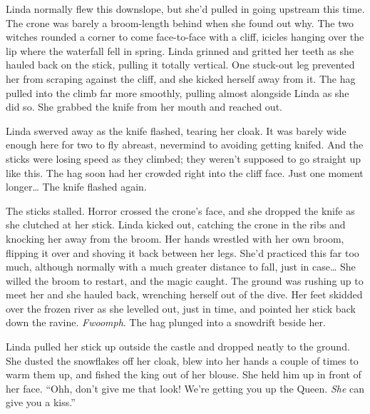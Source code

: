 Linda normally flew this downslope, but she'd pulled in going upstream this time.
The crone was barely a broom-length behind when she found out why.
The two witches rounded a corner to come face-to-face with a cliff, icicles hanging over the lip where the waterfall fell in spring.
Linda grinned and gritted her teeth as she hauled back on the stick, pulling it totally vertical.
One stuck-out leg prevented her from scraping against the cliff, and she kicked herself away from it.
The hag pulled into the climb far more smoothly, pulling almost alongside Linda as she did so.
She grabbed the knife from her mouth and reached out.

Linda swerved away as the knife flashed, tearing her cloak.
It was barely wide enough here for two to fly abreast, nevermind to avoiding getting knifed.
And the sticks were losing speed as they climbed; they weren't supposed to go straight up like this.
The hag soon had her crowded right into the cliff face.
Just one moment longer{\dots}
The knife flashed again.

The sticks stalled.
Horror crossed the crone's face, and she dropped the knife as she clutched at her stick.
Linda kicked out, catching the crone in the ribs and knocking her away from the broom.
Her hands wrestled with her own broom, flipping it over and shoving it back between her legs.
She'd practiced this far too much, although normally with a much greater distance to fall, just in case{\dots}
She willed the broom to restart, and the magic caught.
The ground was rushing up to meet her and she hauled back, wrenching herself out of the dive.
Her feet skidded over the frozen river as she levelled out, just in time, and pointed her stick back down the ravine.
\emph{Fwoomph}.
The hag plunged into a snowdrift beside her.

\storybreak

Linda pulled her stick up outside the castle and dropped neatly to the ground.
She dusted the snowflakes off her cloak, blew into her hands a couple of times to warm them up, and fished the king out of her blouse.
She held him up in front of her face.
``Ohh, don't give me that look!
We're getting you up the Queen.
\emph{She} can give you a kiss.''
